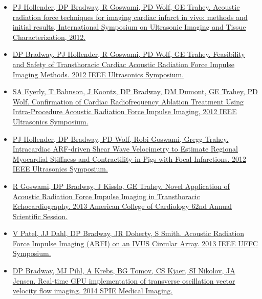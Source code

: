 \documentclass[letterpaper,10pt,english]{sphinxmanual}
\begin{document}
\begin{itemize}
\item {} 
\href{http://uitc-symposium.org/2012\_abstracts.pdf}{PJ Hollender, DP Bradway, R Goswami, PD Wolf, GE Trahey. Acoustic
radiation force techniques for imaging cardiac infarct in vivo:
methods and initial results, International Symposium on Ultrasonic
Imaging and Tissue Characterization,
2012.}

\item {} 
\href{http://dx.doi.org/10.1109/ULTSYM.2012.0507}{DP Bradway, PJ Hollender, R Goswami, PD Wolf, GE Trahey. Feasibility
and Safety of Transthoracic Cardiac Acoustic Radiation Force Impulse
Imaging Methods. 2012 IEEE Ultrasonics
Symposium.}

\item {} 
\href{http://dx.doi.org/10.1109/ULTSYM.2012.0509}{SA Eyerly, T Bahnson, J Koontz, DP Bradway, DM Dumont, GE Trahey, PD
Wolf. Confirmation of Cardiac Radiofrequency Ablation Treatment Using
Intra-Procedure Acoustic Radiation Force Impulse Imaging, 2012 IEEE
Ultrasonics
Symposium.}

\item {} 
\href{http://dx.doi.org/10.1109/ULTSYM.2012.0508}{PJ Hollender, DP Bradway, PD Wolf, Robi Goswami, Gregg Trahey.
Intracardiac ARF-driven Shear Wave Velocimetry to Estimate Regional
Myocardial Stiffness and Contractility in Pigs with Focal
Infarctions. 2012 IEEE Ultrasonics
Symposium.}

\item {} 
\href{http://dx.doi.org/10.1016/S0735-1097(13)61090-6}{R Goswami, DP Bradway, J Kisslo, GE Trahey. Novel Application of
Acoustic Radiation Force Impulse Imaging in Transthoracic
Echocardiography. 2013 American College of Cardiology 62nd Annual
Scientific
Session.}

\item {} 
\href{http://dx.doi.org/10.1109/ULTSYM.2013.0199}{V Patel, JJ Dahl, DP Bradway, JR Doherty, S Smith. Acoustic
Radiation Force Impulse Imaging (ARFI) on an IVUS Circular Array.
2013 IEEE UFFC
Symposium.}

\item {} 
\href{http://dx.doi.org/10.1117/12.2043582}{DP Bradway, MJ Pihl, A Krebs, BG Tomov, CS Kjaer, SI Nikolov, JA
Jensen. Real-time GPU implementation of transverse oscillation vector
velocity flow imaging. 2014 SPIE Medical
Imaging.}

\end{itemize}



\renewcommand{\indexname}{Index}
\printindex
\end{document}
